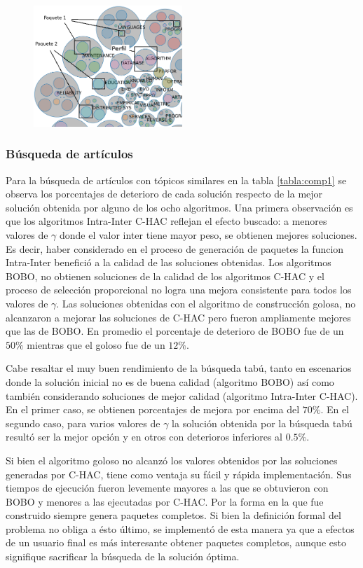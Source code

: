 \begin{figure}[H]
  \centering
    \includegraphics[width=0.5\textwidth]{img/explain-bubbles.png}
  \caption{}
  \label{res:img-explain-bubbles}
\end{figure}

\subsubsection{Búsqueda de artículos}
Para la búsqueda de artículos con tópicos similares en la tabla \ref{tabla:comp1} se observa los porcentajes de deterioro de cada solución respecto de la mejor solución obtenida por alguno de los ocho algoritmos. Una primera observación es que los algoritmos  Intra-Inter C-HAC reflejan el efecto buscado: a menores valores de $\gamma$ donde el valor inter tiene mayor peso, se obtienen mejores soluciones. Es decir, haber considerado en el proceso de generación de paquetes la funcion Intra-Inter benefició a la calidad de las soluciones obtenidas. Los algoritmos BOBO, no obtienen soluciones de la calidad de los algoritmos C-HAC y el proceso de selección proporcional no logra una mejora consistente para todos los valores de $\gamma$. Las soluciones obtenidas con el algoritmo de construcción golosa, no alcanzaron a mejorar las soluciones de C-HAC pero fueron ampliamente mejores que las de BOBO. En promedio el porcentaje de deterioro de BOBO fue de un $50\%$ mientras que el goloso fue de un $12\%$. 

Cabe resaltar el muy buen rendimiento de la búsqueda tabú, tanto en escenarios donde la solución inicial no es de buena calidad (algoritmo BOBO) así como también considerando soluciones de mejor calidad (algoritmo Intra-Inter C-HAC). En el primer caso, se obtienen porcentajes de mejora por encima del $70\%$. En el segundo caso, para varios valores de $\gamma$ la solución obtenida por la búsqueda tabú resultó ser la mejor opción y en otros con deterioros inferiores al $0.5\%$.

Si bien el algoritmo goloso no alcanzó los valores obtenidos por las soluciones generadas por C-HAC, tiene como ventaja su fácil y rápida implementación. Sus tiempos de ejecución fueron levemente mayores a las que se obtuvieron con BOBO y menores a las ejecutadas por C-HAC. Por la forma en la que fue construido siempre genera paquetes completos. Si bien la definición formal del problema no obliga a ésto último, se implementó de esta manera ya que a efectos de un usuario final es más interesante obtener paquetes completos, aunque esto signifique sacrificar la búsqueda de la solución óptima.

